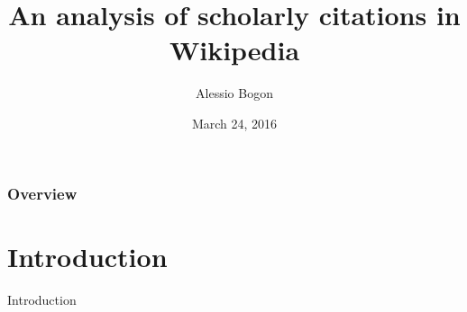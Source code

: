 \documentclass{beamer}
\title[Scholarly citations in Wikipedia]{An analysis of scholarly citations in Wikipedia} %
\author{Alessio Bogon} %
\institute[University of Trento] %
{University of Trento \\ %
Department of Information Engineering and Computer Science \\
\medskip
Master Degree in Computer Science
}
\date{March 24, 2016} %
\begin{document}
\begin{frame}
\titlepage %
\end{frame}

\begin{frame}
\frametitle{Overview} %
\tableofcontents %
\end{frame}


\section{Introduction} %
\begin{frame}[c]
\Huge{\centerline{Introduction}}
\end{frame}
\end{document}
